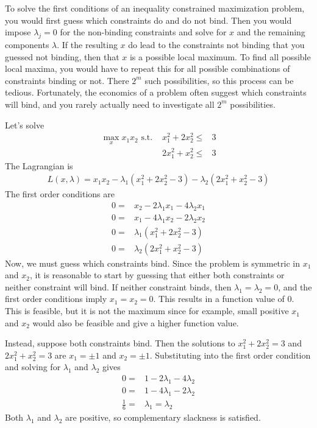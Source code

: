 To solve the first conditions of an inequality constrained
maximization problem, you would first guess which constraints do and
do not bind. Then you would impose $\lambda_j = 0$ for the non-binding
constraints and solve for $x$ and the remaining components
$\lambda$. If the resulting $x$ do lead to the constraints not binding
that you guessed not binding, then that $x$ is a possible local
maximum. To find all possible local maxima, you would have to repeat
this for all possible combinations of constraints binding or
not. There $2^m$ such possibilities, so this process can be
tedious. Fortunately, the economics of a problem often suggest which
constraints will bind, and you rarely actually need to investigate all
$2^m$ possibilities.

\begin{example}
  Let's solve
  \begin{align*}
    \max_x x_1 x_2 \text{ s.t. } & x_1^2 + 2x_2^2 \leq & 3 \\
    & 2 x_1^2 + x_2^2 \leq & 3
  \end{align*}
  The Lagrangian is
  \begin{align*}
    L(x,\lambda) = x_1x_2 - \lambda_1(x_1^2 + 2x_2^2 - 3) -
    \lambda_2(2 x_1^2 + x_2^2 - 3) 
  \end{align*}
  The first order conditions are
  \begin{align*}
    0 = & x_2 - 2\lambda_1 x_1 - 4\lambda_2 x_1 \\
    0 = & x_1 - 4\lambda_1 x_2 - 2\lambda_2 x_2  \\
    0 = & \lambda_1(x_1^2 + 2x_2^2 - 3) \\
    0 = & \lambda_2(2 x_1^2 + x_2^2 - 3) 
  \end{align*}
  Now, we must guess which constraints bind. Since the problem is
  symmetric in $x_1$ and $x_2$, it is reasonable to start by guessing that either
  both constraints or neither constraint will bind. If neither
  constraint binds, then $\lambda_1 = \lambda_2 = 0$, and the first
  order conditions imply $x_1 = x_2 = 0$. This results in a function
  value of $0$. This is feasible, but it is not the maximum since for
  example, small positive $x_1$ and $x_2$ would also be feasible and
  give a higher function value. 

  Instead, suppose both constraints bind. Then the solutions to 
  $x_1^2 + 2x_2^2 = 3$ and $2 x_1^2 + x_2^2 = 3$ are $x_1 = \pm 1$ and
  $x_2 = \pm 1$. Substituting into the first order condition and
  solving for $\lambda_1$ and $\lambda_2$ gives
  \begin{align*} 
    0 = & 1 - 2 \lambda_1 - 4\lambda_2 \\
    0 = & 1 - 4 \lambda_1 - 2\lambda_2 \\
    \frac{1}{6} = & \lambda_1 = \lambda_2
  \end{align*}
  Both $\lambda_1$ and $\lambda_2$ are positive, so complementary
  slackness is satisfied.


\end{example}
